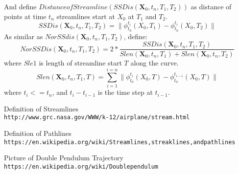 \documentclass[
     11pt,         %
     a4paper,      %
     oneside,
     ]{article}
\newcommand{\vect}[1]{\boldsymbol{#1}}
\begin{document}
	And define $Distance of Streamline (SSDis(\vect{X}_{0},t_{n},T_{1},T_{2}))$ as distance of points at time $t_{n}$ streamlines start at $X_{0}$ at $ T_{1} $ and $ T_{2} $.
	$$SSDis(\vect{X}_{0},t_{n},T_{1},T_{2})=\biggr\lVert \phi_{t_{0}}^{t_{i}}(X_{0},T_{1})-\phi_{t_{0}}^{t_{i}}(X_{0},T_{2})\biggr\rVert$$
	As similar as $NorSSdis(\vect{X}_{0},t_{n},T_{1},T_{2})$, define:
	$$NorSSDis(\vect{X}_{0},t_{n},T_{1},T_{2})=2*\frac{SSDis(\vect{X}_{0},t_{n},T_{1},T_{2})}{Slen(\vect{X}_{0},t_{n},T_{1})+Slen(\vect{X}_{0},t_{n},T_{2})}$$
	where $Sle1$ is length of streamline start $T$ along the curve.
	$$Slen(\vect{X}_{0},t_{n},T_{1},T)=\sum_{i=1}^{i=n}\biggr\lVert\phi_{t_{0}}^{t_{i}}(X_{0},T)-\phi_{t_{0}}^{t_{i-1}}(X_{0},T)\biggr\rVert$$
	where $t_{i}<=t_{n}$, and $t_{i}-t_{i-1}$ is the time step at $t_{i-1}$.













\begin{thebibliography}{9}	
	Definition of Streamlines
	\\\texttt{http://www.grc.nasa.gov/WWW/k-12/airplane/stream.html}
	
	Definition of Pathlines
	\\\texttt{https://en.wikipedia.org/wiki/Streamlines,streaklines,andpathlines}
	
	Picture of Double Pendulum Trajectory
	\\\texttt{https://en.wikipedia.org/wiki/Doublependulum}
	\bibitem{}

\end{thebibliography}
\end{document}
